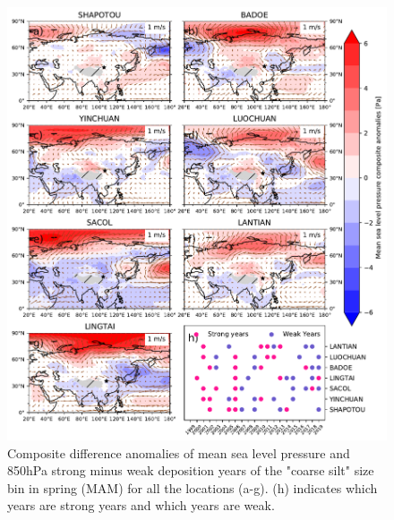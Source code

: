 \begin{figure}[htbp]
    \centering
    \includegraphics[width=\textwidth]{texfiles/figs/mslp_850hPa_20micron_MAM.pdf}
    \caption{Composite difference anomalies of mean sea level pressure and 850hPa strong minus weak deposition years of the "coarse silt" size bin in spring (MAM) for all the locations (a-g).  (h) indicates which years are strong years and which years are weak.}
    \label{fig:MAM_850_coarse_composite}
\end{figure}


